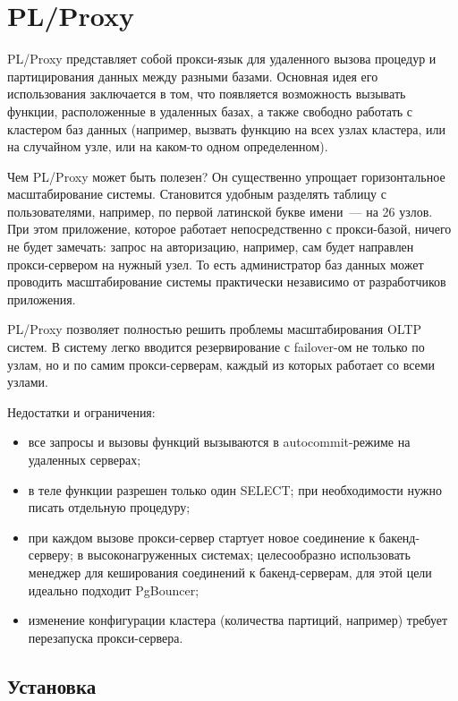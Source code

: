 \section{PL/Proxy}
\label{sec:plproxy}

PL/Proxy представляет собой прокси-язык для удаленного вызова процедур и партицирования данных между разными базами. Основная идея его использования заключается в том, что появляется возможность вызывать функции, расположенные в удаленных базах, а также свободно работать с кластером баз данных (например, вызвать функцию на всех узлах кластера, или на случайном узле, или на каком-то одном определенном).

Чем PL/Proxy может быть полезен? Он существенно упрощает горизонтальное масштабирование системы. Становится удобным разделять таблицу с пользователями, например, по первой латинской букве имени~--- на 26 узлов. При этом приложение, которое работает непосредственно с прокси-базой, ничего не будет замечать: запрос на авторизацию, например, сам будет направлен прокси-сервером на нужный узел. То есть администратор баз данных может проводить масштабирование системы практически независимо от разработчиков приложения.

PL/Proxy позволяет полностью решить проблемы масштабирования OLTP систем. В систему легко вводится резервирование с failover-ом не только по узлам, но и по самим прокси-серверам, каждый из которых работает со всеми узлами.

Недостатки и ограничения:

\begin{itemize}
  \item все запросы и вызовы функций вызываются в autocommit-режиме на удаленных серверах;
  \item в теле функции разрешен только один SELECT; при необходимости нужно писать отдельную процедуру;
  \item при каждом вызове прокси-сервер стартует новое соединение к бакенд-серверу; в высоконагруженных системах;
  целесообразно использовать менеджер для кеширования соединений к бакенд-серверам, для этой цели идеально подходит PgBouncer;
  \item изменение конфигурации кластера (количества партиций, например) требует перезапуска прокси-сервера.
\end{itemize}


\subsection{Установка}

